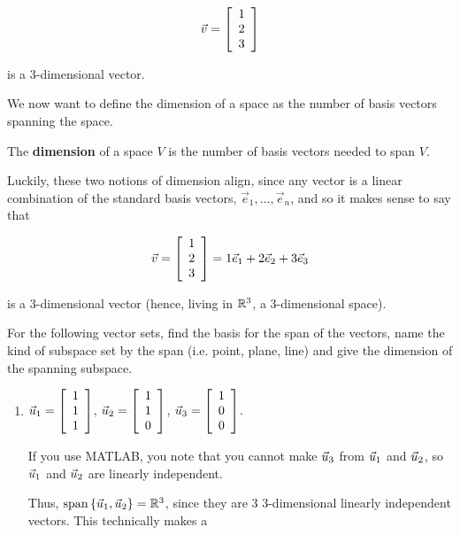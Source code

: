 \documentclass{ximera}
\begin{document}
\begin{exploration}
\begin{remark}
  $$\vec{v}=\startmat{r} 1 \\ 2 \\ 3 \stopmat$$

  is a 3-dimensional vector.

  We now want to define the dimension of a space as the number of basis vectors spanning the space.

  \begin{definition}
  
    The \textbf{dimension} of a space $V$ is the number of basis vectors needed to span $V$.

  \end{definition}

  Luckily, these two notions of dimension align, since any vector is a linear combination of the standard basis vectors, $\vec{e}_1,\ldots,\vec{e}_n$, and so it makes sense to say that 

  $$\vec{v}=\startmat{r} 1 \\ 2 \\ 3 \stopmat=1\vec{e}_1+2\vec{e}_2+3\vec{e}_3$$

  is a 3-dimensional vector (hence, living in $\R^3$, a 3-dimensional space).

\end{remark}

\begin{example}

  For the following vector sets, find the basis for the span of the vectors, name the kind of subspace set by the span (i.e. point, plane, line) and give the dimension of the spanning subspace.

  \begin{enumerate}

    \item $\vect{u}_1=\startmat{r} 1 \\ 1 \\ 1 \stopmat$, $\vect{u}_2=\startmat{r} 1 \\ 1 \\ 0 \stopmat$, $\vect{u}_3=\startmat{r} 1 \\ 0 \\ 0 \stopmat$.
    
    \begin{solution}
    
      If you use MATLAB, you note that you cannot make $\vect{u}_3$ from $\vect{u}_1$ and $\vect{u}_2$, so $\vect{u}_1$ and $\vect{u}_2$ are linearly independent. 
      
      Thus, $\sspan\set{\vect{u}_1,\vect{u}_2}=\R^3$, since they are 3 $3$-dimensional linearly independent vectors. This technically makes a 


\end{solution}
\end{enumerate}
\end{example}
\end{exploration}
\end{document}
